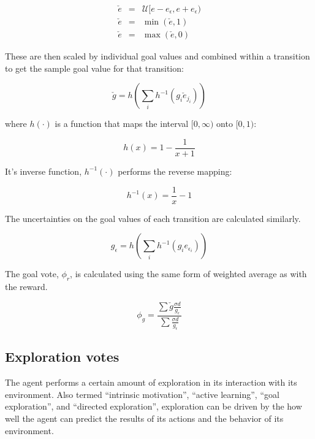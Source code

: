 \begin{eqnarray}
\check{e} &=& \mathcal{U}[e - e_{\epsilon},e + e_{\epsilon}) \\
\check{e} &=& \min(\check{e}, 1) \\
\check{e} &=& \max(\check{e}, 0)
\end{eqnarray}

These are then scaled by individual goal values and combined within a transition to get the sample goal value for that transition:

\begin{equation}
\check{g} = h( \sum_i h^{-1}(g_i \check{e}_{j_i}))
\end{equation}

where  $h(\cdot)$ is a function that maps the interval $[0, \infty)$ onto $[0,1)$:

\begin{equation}
h(x) = 1 - \frac{1}{x + 1} 
\label{inf_to_one_map}
\end{equation}

It's inverse function, $h^{-1}(\cdot)$ performs the reverse mapping:

\begin{equation}
h^{-1}(x) = \frac{1}{x} - 1
\label{one_to_inf_map}
\end{equation}

The uncertainties on the goal values of each transition are calculated similarly.

\begin{equation}
g_{\epsilon} = h \left ( \sum_i h^{-1}(g_i e_{\epsilon_i}) \right )
\end{equation}

The goal vote, $\phi_r$, is calculated using the same form of weighted average as with the reward.

\begin{equation}
\phi_g = \frac{\sum \check{g} \frac{\sigma d} {g_{\epsilon}}}{\sum \frac{\sigma d} {g_{\epsilon}}} 
\end{equation}

\subsection{Exploration votes}

The agent performs a certain amount of exploration in its interaction with its environment. Also termed ``intrinsic motivation'', ``active learning'', ``goal exploration'', and ``directed exploration'',  exploration can be driven by the how well the agent can predict the results of its actions and the behavior of its environment. 

